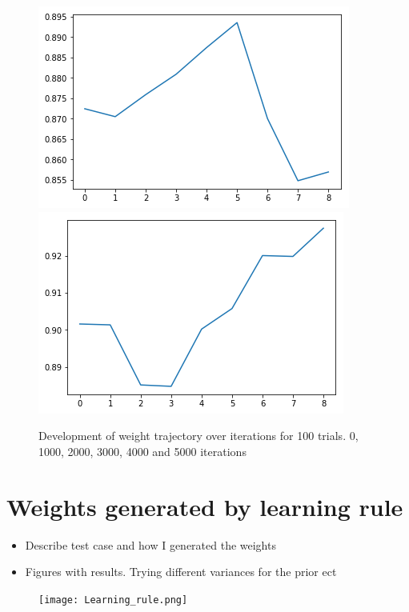 \begin{figure}[hbt!]
    \includegraphics[scale = 0.3]{fig/4000_it_100.png}
    \includegraphics[scale = 0.3]{fig/5000_it_100.png}
    \caption{Development of weight trajectory over iterations for 100 trials. 0, 1000, 2000, 3000, 4000 and 5000 iterations}
    \label{w_trajectory_1000}
\end{figure}

\section{Weights generated by learning rule}

\begin{itemize}
    \item Describe test case and how I generated the weights
    \item Figures with results. Trying different variances for the prior ect
\end{itemize}

\begin{figure}[hbt!]
    \centering
    \texttt{[image: Learning\_rule.png]}
\end{figure}

\cleardoublepage